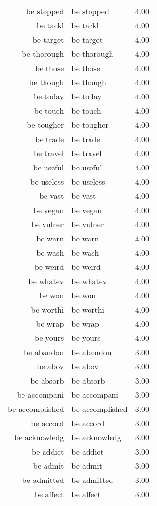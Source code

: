 \begin{table}[ht]
\begin{tabular}{rlr}
  be stopped & be stopped & 4.00 \\ 
  be tackl & be tackl & 4.00 \\ 
  be target & be target & 4.00 \\ 
  be thorough & be thorough & 4.00 \\ 
  be those & be those & 4.00 \\ 
  be though & be though & 4.00 \\ 
  be today & be today & 4.00 \\ 
  be touch & be touch & 4.00 \\ 
  be tougher & be tougher & 4.00 \\ 
  be trade & be trade & 4.00 \\ 
  be travel & be travel & 4.00 \\ 
  be useful & be useful & 4.00 \\ 
  be useless & be useless & 4.00 \\ 
  be vast & be vast & 4.00 \\ 
  be vegan & be vegan & 4.00 \\ 
  be vulner & be vulner & 4.00 \\ 
  be warn & be warn & 4.00 \\ 
  be wash & be wash & 4.00 \\ 
  be weird & be weird & 4.00 \\ 
  be whatev & be whatev & 4.00 \\ 
  be won & be won & 4.00 \\ 
  be worthi & be worthi & 4.00 \\ 
  be wrap & be wrap & 4.00 \\ 
  be yours & be yours & 4.00 \\ 
  be abandon & be abandon & 3.00 \\ 
  be abov & be abov & 3.00 \\ 
  be absorb & be absorb & 3.00 \\ 
  be accompani & be accompani & 3.00 \\ 
  be accomplished & be accomplished & 3.00 \\ 
  be accord & be accord & 3.00 \\ 
  be acknowledg & be acknowledg & 3.00 \\ 
  be addict & be addict & 3.00 \\ 
  be admit & be admit & 3.00 \\ 
  be admitted & be admitted & 3.00 \\ 
  be affect & be affect & 3.00 \\ 

\end{tabular}
\end{table}
